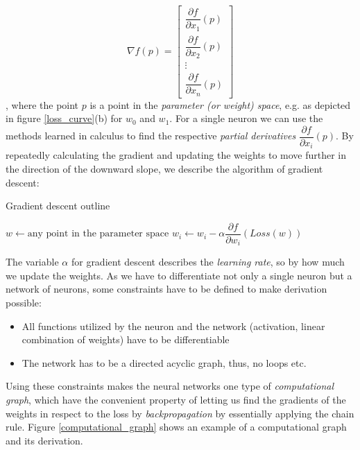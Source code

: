 $$
    \nabla f(p)=\left[\begin{array}{c}
            \dfrac{\partial f}{\partial x_1}(p) \\
            \dfrac{\partial f}{\partial x_2}(p) \\
            \vdots                              \\
            \dfrac{\partial f}{\partial x_n}(p)
        \end{array}\right]
$$,
where the point $p $ is a point in the \textit{parameter (or weight) space}, e.g. as depicted in figure \ref{loss_curve}(b) for $w_0 $ and $ w_1 $. For a single neuron we can use the methods learned in calculus to find the respective \textit{partial derivatives} $  \dfrac{\partial f}{\partial x_i}(p) $. By repeatedly calculating the gradient and updating the weights to move further in the direction of the downward slope, we describe the algorithm of gradient descent:

\begin{algorithm}
    \caption{Gradient descent outline \cite[p. 1253]{russell_artificial_2021}}\label{alg:gradient_descent}
    \begin{algorithmic}
        \State $w \gets \text{any point in the parameter space}$
        \State $w_i \gets w_i - \alpha \dfrac{\partial f}{\partial w_i}(Loss(w))$
        \EndFor
        \EndWhile
    \end{algorithmic}
\end{algorithm}

The variable $ \alpha $ for gradient descent describes the \textit{learning rate}, so by how much we update the weights. As we have to differentiate not only a single neuron but a network of neurons, some constraints have to be defined to make derivation possible:

\begin{itemize}
    \item All functions utilized by the neuron and the network (activation, linear combination of weights) have to be differentiable
    \item The network has to be a directed acyclic graph, thus, no loops etc.
\end{itemize}

Using these constraints makes the neural networks one type of \textit{computational graph}, which have the convenient property of letting us find the gradients of the weights in respect to the loss by \textit{backpropagation} by essentially applying the chain rule. Figure \ref{computational_graph} shows an example of a computational graph and its derivation.


